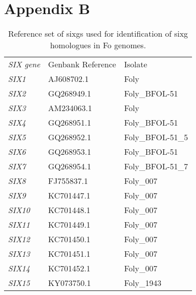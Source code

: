 
\clearpage
\section{Appendix B}
\begin{table}[h]
\caption{Reference \ac{mimp} sequences used to build \ac{hmm}}
\label{apx:RefMimps}
\end{table}

\normalsize
\clearpage
\begin{table}[h]
\centering
\caption{Reference set of \acfp{sixg} used for identification of \ac{sixg} homologues in \acl{Fo} genomes. }
\label{apx:sixgenerefs}
\begin{tabular}{lll}
\textit{SIX gene} & Genbank Reference & Isolate \\
\textit{SIX1} & AJ608702.1 & Foly \\
\textit{SIX2} & GQ268949.1 & Foly\_BFOL-51 \\
\textit{SIX3} & AM234063.1 & Foly \\
\textit{SIX4} & GQ268951.1 & Foly\_BFOL-51 \\
\textit{SIX5} & GQ268952.1 & Foly\_BFOL-51\_5 \\
\textit{SIX6} & GQ268953.1 & Foly\_BFOL-51 \\
\textit{SIX7} & GQ268954.1 & Foly\_BFOL-51\_7 \\
\textit{SIX8} & FJ755837.1 & Foly\_007 \\
\textit{SIX9} & KC701447.1 & Foly\_007 \\
\textit{SIX10} & KC701448.1 & Foly\_007 \\
\textit{SIX11} & KC701449.1 & Foly\_007 \\
\textit{SIX12} & KC701450.1 & Foly\_007 \\
\textit{SIX13} & KC701451.1 & Foly\_007 \\
\textit{SIX14} & KC701452.1 & Foly\_007 \\
\textit{SIX15} & KY073750.1 & Foly\_1943
\end{tabular}%
\end{table}